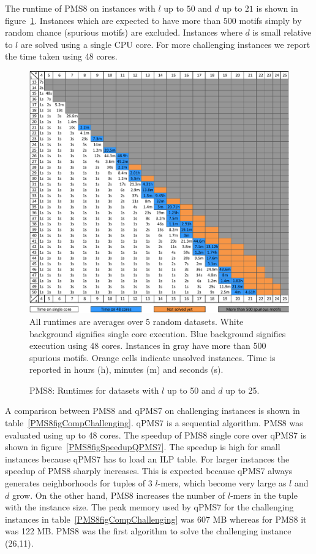 The runtime of PMS8 on instances with $l$ up to $50$ and $d$ up
to $21$ is shown in figure~\ref{PMS8figLDTable}. Instances which are expected to
have more than $500$ motifs simply by random chance (spurious motifs) are excluded.
Instances where $d$ is small relative to $l$ are solved using a single CPU core.
For more challenging instances we report the time taken using 48 cores.

\begin{figure}
\caption{PMS8: Runtimes for datasets with $l$ up to 50 and $d$ up to
25.}\label{PMS8figLDTable}
\includegraphics[width=1\linewidth]{PMS8dnaruntimes}
 All runtimes are averages over 5 random datasets.
 White background signifies single
core execution.  Blue background signifies execution using 48 cores.
Instances in gray have more than 500 spurious motifs. Orange
cells indicate unsolved instances. Time is reported in hours (h), minutes (m)
and seconds (s).
\end{figure}

A comparison between PMS8 and qPMS7 \cite{DRD12} on
challenging instances is shown in table~\ref{PMS8figCompChallenging}.
qPMS7 is a sequential algorithm. PMS8 was evaluated using up to 48 cores.
The speedup of PMS8 single core over qPMS7
is shown in figure~\ref{PMS8figSpeedupQPMS7}. The speedup is high for small
instances because qPMS7 has to load an ILP table. 
For larger instances the speedup of PMS8 sharply increases. This is expected
because qPMS7 always generates neighborhoods for tuples of $3$ $l$-mers, 
which become very large as $l$ and $d$ grow. On the other hand, PMS8 increases
the number of $l$-mers in the tuple with the instance size. 
 The peak memory used by qPMS7 for the challenging instances in
 table~\ref{PMS8figCompChallenging} was 607 MB whereas for PMS8 it was 122 MB.
 PMS8 was the first algorithm to solve the challenging instance (26,11).


